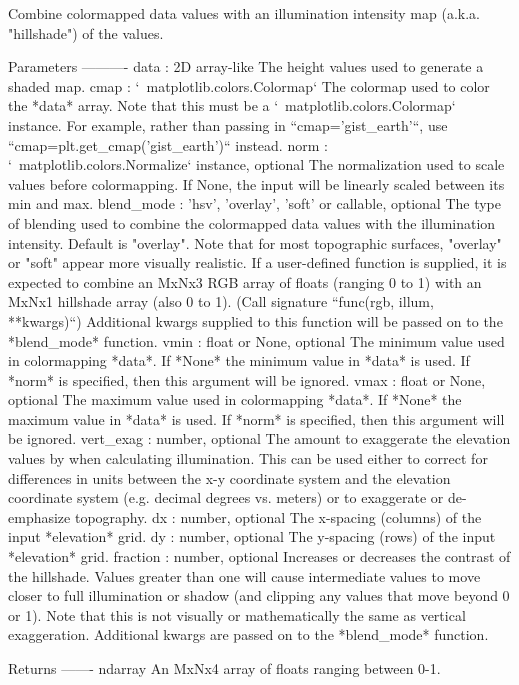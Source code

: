 \begin{DoxyVerb}Combine colormapped data values with an illumination intensity map
(a.k.a.  "hillshade") of the values.

Parameters
----------
data : 2D array-like
    The height values used to generate a shaded map.
cmap : `~matplotlib.colors.Colormap`
    The colormap used to color the *data* array. Note that this must be
    a `~matplotlib.colors.Colormap` instance.  For example, rather than
    passing in ``cmap='gist_earth'``, use
    ``cmap=plt.get_cmap('gist_earth')`` instead.
norm : `~matplotlib.colors.Normalize` instance, optional
    The normalization used to scale values before colormapping. If
    None, the input will be linearly scaled between its min and max.
blend_mode : {'hsv', 'overlay', 'soft'} or callable, optional
    The type of blending used to combine the colormapped data
    values with the illumination intensity.  Default is
    "overlay".  Note that for most topographic surfaces,
    "overlay" or "soft" appear more visually realistic. If a
    user-defined function is supplied, it is expected to
    combine an MxNx3 RGB array of floats (ranging 0 to 1) with
    an MxNx1 hillshade array (also 0 to 1).  (Call signature
    ``func(rgb, illum, **kwargs)``) Additional kwargs supplied
    to this function will be passed on to the *blend_mode*
    function.
vmin : float or None, optional
    The minimum value used in colormapping *data*. If *None* the
    minimum value in *data* is used. If *norm* is specified, then this
    argument will be ignored.
vmax : float or None, optional
    The maximum value used in colormapping *data*. If *None* the
    maximum value in *data* is used. If *norm* is specified, then this
    argument will be ignored.
vert_exag : number, optional
    The amount to exaggerate the elevation values by when calculating
    illumination. This can be used either to correct for differences in
    units between the x-y coordinate system and the elevation
    coordinate system (e.g. decimal degrees vs. meters) or to
    exaggerate or de-emphasize topography.
dx : number, optional
    The x-spacing (columns) of the input *elevation* grid.
dy : number, optional
    The y-spacing (rows) of the input *elevation* grid.
fraction : number, optional
    Increases or decreases the contrast of the hillshade.  Values
    greater than one will cause intermediate values to move closer to
    full illumination or shadow (and clipping any values that move
    beyond 0 or 1). Note that this is not visually or mathematically
    the same as vertical exaggeration.
Additional kwargs are passed on to the *blend_mode* function.

Returns
-------
ndarray
    An MxNx4 array of floats ranging between 0-1.
\end{DoxyVerb}
 \mbox{\label{classmatplotlib_1_1colors_1_1LightSource_a467508ec8a8aba2145df2209faf360c9}} 

